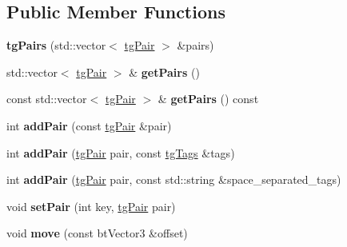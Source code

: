 \subsection*{Public Member Functions}
\begin{DoxyCompactItemize}
\item 
\hypertarget{classtg_pairs_a26a87e18bd09771875b52002ad71541a}{{\bfseries tg\-Pairs} (std\-::vector$<$ \hyperlink{classtg_pair}{tg\-Pair} $>$ \&pairs)}\label{classtg_pairs_a26a87e18bd09771875b52002ad71541a}

\item 
\hypertarget{classtg_pairs_a27af66df47ecf287d81e00fd821d649d}{std\-::vector$<$ \hyperlink{classtg_pair}{tg\-Pair} $>$ \& {\bfseries get\-Pairs} ()}\label{classtg_pairs_a27af66df47ecf287d81e00fd821d649d}

\item 
\hypertarget{classtg_pairs_ada440049a85ba1caf3273e3501e639b4}{const std\-::vector$<$ \hyperlink{classtg_pair}{tg\-Pair} $>$ \& {\bfseries get\-Pairs} () const }\label{classtg_pairs_ada440049a85ba1caf3273e3501e639b4}

\item 
\hypertarget{classtg_pairs_a51b22e8e22efeee27e5b724fb866b2f5}{int {\bfseries add\-Pair} (const \hyperlink{classtg_pair}{tg\-Pair} \&pair)}\label{classtg_pairs_a51b22e8e22efeee27e5b724fb866b2f5}

\item 
\hypertarget{classtg_pairs_a100e3b9c3020114b9033efd1d6a1857a}{int {\bfseries add\-Pair} (\hyperlink{classtg_pair}{tg\-Pair} pair, const \hyperlink{classtg_tags}{tg\-Tags} \&tags)}\label{classtg_pairs_a100e3b9c3020114b9033efd1d6a1857a}

\item 
\hypertarget{classtg_pairs_aa703c30d64fb7de4dfa53bb657169ed2}{int {\bfseries add\-Pair} (\hyperlink{classtg_pair}{tg\-Pair} pair, const std\-::string \&space\-\_\-separated\-\_\-tags)}\label{classtg_pairs_aa703c30d64fb7de4dfa53bb657169ed2}

\item 
\hypertarget{classtg_pairs_a3272420aaaace6ce676fd76b0eda5942}{void {\bfseries set\-Pair} (int key, \hyperlink{classtg_pair}{tg\-Pair} pair)}\label{classtg_pairs_a3272420aaaace6ce676fd76b0eda5942}

\item 
\hypertarget{classtg_pairs_a790ef34627f1d963a2f31db6d04030eb}{void {\bfseries move} (const bt\-Vector3 \&offset)}\label{classtg_pairs_a790ef34627f1d963a2f31db6d04030eb}


\end{DoxyCompactItemize}

